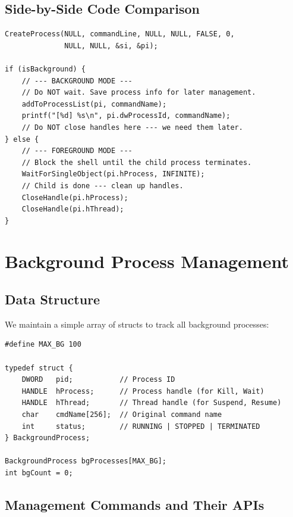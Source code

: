 \documentclass[12pt,a4paper]{article}
\begin{document}
\subsection{Side-by-Side Code Comparison}

\begin{lstlisting}
CreateProcess(NULL, commandLine, NULL, NULL, FALSE, 0,
              NULL, NULL, &si, &pi);

if (isBackground) {
    // --- BACKGROUND MODE ---
    // Do NOT wait. Save process info for later management.
    addToProcessList(pi, commandName);
    printf("[%d] %s\n", pi.dwProcessId, commandName);
    // Do NOT close handles here --- we need them later.
} else {
    // --- FOREGROUND MODE ---
    // Block the shell until the child process terminates.
    WaitForSingleObject(pi.hProcess, INFINITE);
    // Child is done --- clean up handles.
    CloseHandle(pi.hProcess);
    CloseHandle(pi.hThread);
}
\end{lstlisting}

\section{Background Process Management}

\subsection{Data Structure}

We maintain a simple array of structs to track all background processes:

\begin{lstlisting}
#define MAX_BG 100

typedef struct {
    DWORD   pid;           // Process ID
    HANDLE  hProcess;      // Process handle (for Kill, Wait)
    HANDLE  hThread;       // Thread handle (for Suspend, Resume)
    char    cmdName[256];  // Original command name
    int     status;        // RUNNING | STOPPED | TERMINATED
} BackgroundProcess;

BackgroundProcess bgProcesses[MAX_BG];
int bgCount = 0;
\end{lstlisting}

\subsection{Management Commands and Their APIs}
\end{document}
